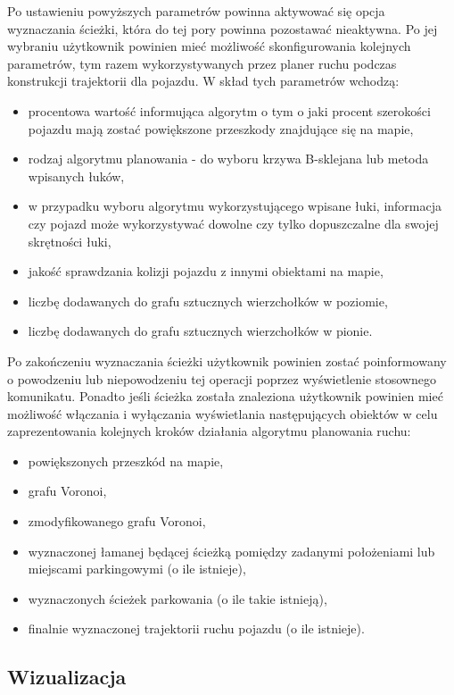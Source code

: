 \documentclass[a4paper,11pt,twoside]{report}
\theoremstyle{definition}
\begin{document}
Po ustawieniu powyższych parametrów powinna aktywować się opcja wyznaczania ścieżki, która do tej pory powinna pozostawać nieaktywna. Po jej wybraniu użytkownik powinien mieć możliwość skonfigurowania kolejnych parametrów, tym razem wykorzystywanych przez planer ruchu podczas konstrukcji trajektorii dla pojazdu. W skład tych parametrów wchodzą:
\begin{itemize}
	\item procentowa wartość informująca algorytm o tym o jaki procent szerokości pojazdu mają zostać powiększone przeszkody znajdujące się na mapie,
	\item rodzaj algorytmu planowania - do wyboru krzywa B-sklejana lub metoda wpisanych łuków,
	\item w przypadku wyboru algorytmu wykorzystującego wpisane łuki, informacja czy pojazd może wykorzystywać dowolne czy tylko dopuszczalne dla swojej skrętności łuki,
	\item jakość sprawdzania kolizji pojazdu z innymi obiektami na mapie,
	\item liczbę dodawanych do grafu sztucznych wierzchołków w poziomie,
	\item liczbę dodawanych do grafu sztucznych wierzchołków w pionie.
\end{itemize}

Po zakończeniu wyznaczania ścieżki użytkownik powinien zostać poinformowany o powodzeniu lub niepowodzeniu tej operacji poprzez wyświetlenie stosownego komunikatu. Ponadto jeśli ścieżka została znaleziona użytkownik powinien mieć możliwość włączania i wyłączania wyświetlania następujących obiektów w celu zaprezentowania kolejnych kroków działania algorytmu planowania ruchu:
\begin{itemize}
	\item powiększonych przeszkód na mapie,
	\item grafu Voronoi,
	\item zmodyfikowanego grafu Voronoi,
	\item wyznaczonej łamanej będącej ścieżką pomiędzy zadanymi położeniami lub miejscami parkingowymi (o ile istnieje),
	\item wyznaczonych ścieżek parkowania (o ile takie istnieją),
	\item finalnie wyznaczonej trajektorii ruchu pojazdu (o ile istnieje).
\end{itemize}

\subsection{Wizualizacja}
\end{document}
